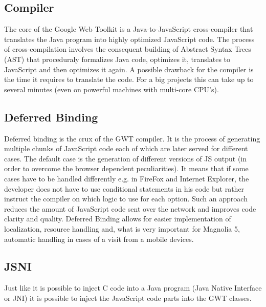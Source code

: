 \subsection{Compiler} 
The core of the Google Web Toolkit is a Java-to-JavaScript cross-compiler that
translates the Java program into highly optimized JavaScript code. The process
of cross-compilation involves the consequent building of Abstract Syntax Trees
(AST) that proceduraly formalizes Java code, optimizes it, translates to
JavaScript and then optimizes it again.
A possible drawback for the compiler is the time it requires to translate the
code. For a big projects this can take up to several minutes (even on powerful
machines with multi-core CPU's).

\subsection{Deferred Binding} 
Deferred binding is the crux of the GWT compiler. It is the process of
generating multiple chunks of JavaScript code each of which are later
served for different cases. The default case is the generation of different
versions of JS output (in order to overcome the browser dependent
peculiarities). It means that if some cases have to be handled differently e.g.
in FireFox and Internet Explorer, the developer does not have to use conditional
statements in his code but rather instruct the compiler on which logic to use
for each option. Such an approach reduces the amount of JavaScript code sent
over the network and improves code clarity and quality. Deferred Binding allows
for easier implementation of localization, resource handling and, what is very
important for Magnolia 5, automatic handling in cases of a visit from a mobile
devices\cite{def_bind}.

\subsection{JSNI}
Just like it is possible to inject C code into a Java program (Java Native
Interface or JNI) it is possible to inject the JavaScript code parts into the
GWT classes.

